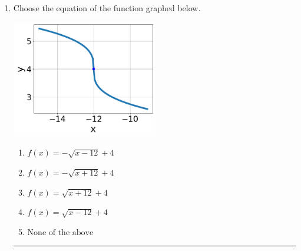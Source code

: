 \documentclass[14pt]{extbook}
\newcommand{\litem}[1]{\item#1\hspace*{-1cm}\rule{\textwidth}{0.4pt}}
\begin{document}
\begin{enumerate}
{\begin{enumerate}[label=\Alph*.]
\end{enumerate} }
\litem{
Choose the equation of the function graphed below.
\begin{center}
    \includegraphics[width=0.5\textwidth]{../Figures/radicalGraphToEquationB.png}
\end{center}
\begin{enumerate}[label=\Alph*.]
\item \( f(x) = - \sqrt{x - 12} + 4 \)
\item \( f(x) = - \sqrt{x + 12} + 4 \)
\item \( f(x) = \sqrt{x + 12} + 4 \)
\item \( f(x) = \sqrt{x - 12} + 4 \)
\item \( \text{None of the above} \)


\end{enumerate}}
\end{enumerate}
\end{document}

